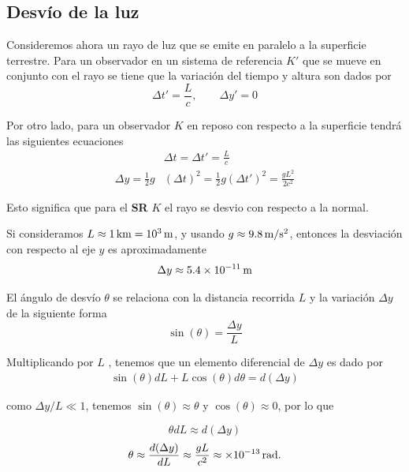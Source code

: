 \subsection{Desvío de la luz\times  }

Consideremos ahora un rayo de luz que se emite en paralelo a la superficie terrestre. Para un observador en un sistema de referencia $K'$ que se mueve en conjunto con el rayo se tiene que la variación del tiempo y altura son dados por 
\begin{equation}
\Delta t'=\frac{L}{c}, \qquad \Delta y' = 0
\end{equation}

Por otro lado, para un observador $K$ en reposo con respecto a la superficie tendrá las siguientes ecuaciones
\begin{align}
&\Delta t= \Delta t' = \frac{L}{c}
\\
\Delta y= \frac{1}{2} g& (\Delta t)^2 = \frac{1}{2} g (\Delta t')^2 = \frac{gL^2}{2c^2}
\end{align}

Esto significa que para el \textbf{SR} $K$ el rayo se desvio con respecto a la normal.
\par
Si consideramos $L\approx 1{\,\rm km} = 10^3{\,\rm m}$, y usando $g\approx 9.8{\,\rm m/s^2}$, entonces la desviación con respecto al eje $y$ es aproximadamente
\begin{equation}
\Delta y \approx 5.4\times 10^{-11}{\,\rm m}
\end{equation}

El ángulo de desvío $\theta$ se relaciona con la distancia recorrida $L$ y la variación $\Delta y$ de la siguiente forma 
\begin{equation}
    \sin(\theta)=\frac{\Delta y}{L}
\end{equation}

Multiplicando por $L$ , tenemos que un elemento diferencial de $\Delta y$ es dado por
\begin{align}
    \sin(\theta)dL+L\cos(\theta)d\theta=d(\Delta y)
\end{align}

como $\Delta y/L \ll 1$, tenemos $\sin(\theta) \approx \theta$ y $\cos(\theta) \approx 0$, por lo que 

\begin{equation}
\theta dL \approx d(\Delta y)
\end{equation}
\begin{equation}
\theta \approx \frac{d(\Delta y)}{dL} \approx \frac{gL}{c^2} \approx \times 10^{-13}{\,\rm rad}.
\end{equation}



